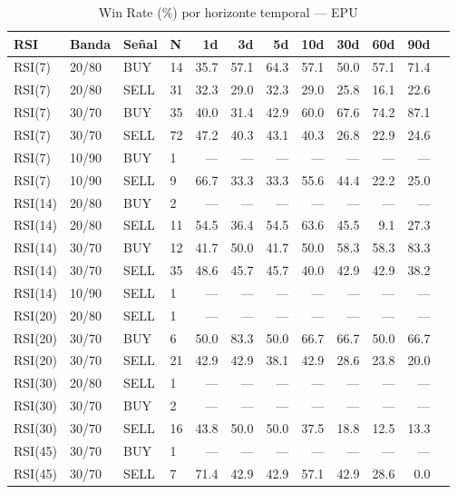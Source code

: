 %
\begin{table}[htbp]
    \centering
    \caption{Win Rate (\%) por horizonte temporal --- EPU}
    \label{tab:winrate_epu}
    \small
    \begin{tabular}{llllrrrrrrrr}
        \toprule
        \textbf{RSI} & \textbf{Banda} & \textbf{Se\~{n}al} & \textbf{N} & \textbf{1d} & \textbf{3d} & \textbf{5d} & \textbf{10d} & \textbf{30d} & \textbf{60d} & \textbf{90d} \\
        \midrule
        RSI(7) & 20/80 & BUY & 14 & 35.7 & 57.1 & 64.3 & 57.1 & 50.0 & 57.1 & 71.4 \\
        RSI(7) & 20/80 & SELL & 31 & 32.3 & 29.0 & 32.3 & 29.0 & 25.8 & 16.1 & 22.6 \\
        RSI(7) & 30/70 & BUY & 35 & 40.0 & 31.4 & 42.9 & 60.0 & 67.6 & 74.2 & 87.1 \\
        RSI(7) & 30/70 & SELL & 72 & 47.2 & 40.3 & 43.1 & 40.3 & 26.8 & 22.9 & 24.6 \\
        RSI(7) & 10/90 & BUY & 1 & --- & --- & --- & --- & --- & --- & --- \\
        RSI(7) & 10/90 & SELL & 9 & 66.7 & 33.3 & 33.3 & 55.6 & 44.4 & 22.2 & 25.0 \\
        \midrule
        RSI(14) & 20/80 & BUY & 2 & --- & --- & --- & --- & --- & --- & --- \\
        RSI(14) & 20/80 & SELL & 11 & 54.5 & 36.4 & 54.5 & 63.6 & 45.5 & 9.1 & 27.3 \\
        RSI(14) & 30/70 & BUY & 12 & 41.7 & 50.0 & 41.7 & 50.0 & 58.3 & 58.3 & 83.3 \\
        RSI(14) & 30/70 & SELL & 35 & 48.6 & 45.7 & 45.7 & 40.0 & 42.9 & 42.9 & 38.2 \\
        RSI(14) & 10/90 & SELL & 1 & --- & --- & --- & --- & --- & --- & --- \\
        \midrule
        RSI(20) & 20/80 & SELL & 1 & --- & --- & --- & --- & --- & --- & --- \\
        RSI(20) & 30/70 & BUY & 6 & 50.0 & 83.3 & 50.0 & 66.7 & 66.7 & 50.0 & 66.7 \\
        RSI(20) & 30/70 & SELL & 21 & 42.9 & 42.9 & 38.1 & 42.9 & 28.6 & 23.8 & 20.0 \\
        \midrule
        RSI(30) & 20/80 & SELL & 1 & --- & --- & --- & --- & --- & --- & --- \\
        RSI(30) & 30/70 & BUY & 2 & --- & --- & --- & --- & --- & --- & --- \\
        RSI(30) & 30/70 & SELL & 16 & 43.8 & 50.0 & 50.0 & 37.5 & 18.8 & 12.5 & 13.3 \\
        \midrule
        RSI(45) & 30/70 & BUY & 1 & --- & --- & --- & --- & --- & --- & --- \\
        RSI(45) & 30/70 & SELL & 7 & 71.4 & 42.9 & 42.9 & 57.1 & 42.9 & 28.6 & 0.0 \\
        \bottomrule
    \end{tabular}
\end{table}
